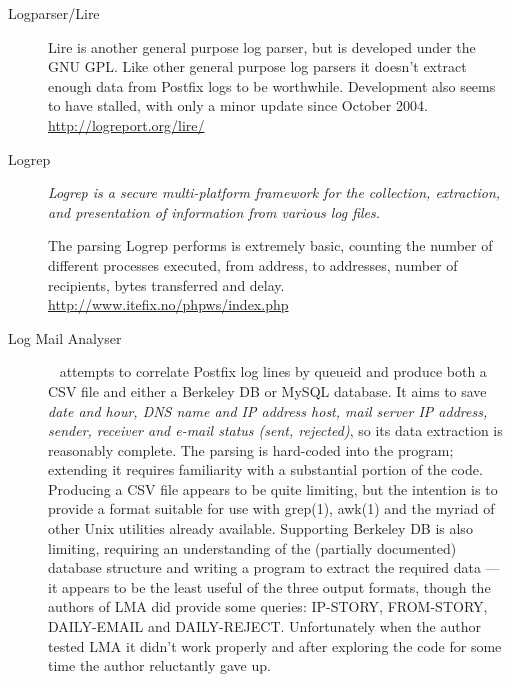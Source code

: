 \documentclass[a4paper,12pt,draft]{article}
\begin{document}
\begin{description}
    \item [Logparser/Lire] Lire is another general purpose log parser, but
        is developed under the GNU GPL\@.  Like other general purpose log
        parsers it doesn't extract enough data from Postfix logs to be
        worthwhile.  Development also seems to have stalled, with only a
        minor update since October 2004.  \newline
        \url{http://logreport.org/lire/}

    \item [Logrep] \textit{Logrep is a secure multi-platform framework for
        the collection, extraction, and presentation of information from
        various log files.\/}

        The parsing Logrep performs is extremely basic, counting the number
        of different processes executed, from address, to addresses, number
        of recipients, bytes transferred and delay.  \newline
        \url{http://www.itefix.no/phpws/index.php}

    \item [Log Mail Analyser]~\cite{log-mail-analyser} attempts to
        correlate Postfix log lines by queueid and produce both a CSV file
        and either a Berkeley DB or MySQL database.  It aims to save
        \textit{date and hour, DNS name and IP address host, mail server IP
        address, sender, receiver and e-mail status (sent, rejected)}, so
        its data extraction is reasonably complete.  The parsing is
        hard-coded into the program; extending it requires familiarity with
        a substantial portion of the code.  Producing a CSV file appears to
        be quite limiting, but the intention is to provide a format
        suitable for use with grep(1), awk(1) and the myriad of other Unix
        utilities already available.  Supporting Berkeley DB is also
        limiting, requiring an understanding of the (partially documented)
        database structure and writing a program to extract the required
        data --- it appears to be the least useful of the three output
        formats, though the authors of LMA did provide some queries:
        IP-STORY, FROM-STORY, DAILY-EMAIL and DAILY-REJECT\@.
        Unfortunately when the author tested LMA it didn't work properly
        and after exploring the code for some time the author reluctantly
        gave up.

\end{description}



\end{document}
